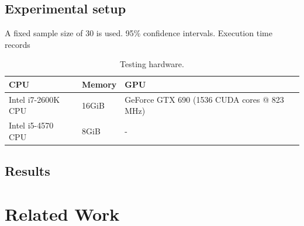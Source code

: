 \subsection*{Experimental setup}

A fixed sample size of 30 is used. 95\% confidence
intervals. Execution time records

\begin{table}
\footnotesize
\centering
\begin{tabular}{| l | l | l | l |}
\hline
\textbf{CPU} & \textbf{Memory} & \textbf{GPU}\\
\hline
Intel i7-2600K CPU & 16GiB & GeForce GTX 690 (1536 CUDA cores @ 823 MHz)\\
Intel i5-4570 CPU & 8GiB & -\\
\hline
\end{tabular}
\caption{Testing hardware.}
\end{table}

\subsection*{Results}

\section*{Related Work}

\cite{Lutz2013}

\cite{Kamil2010}

